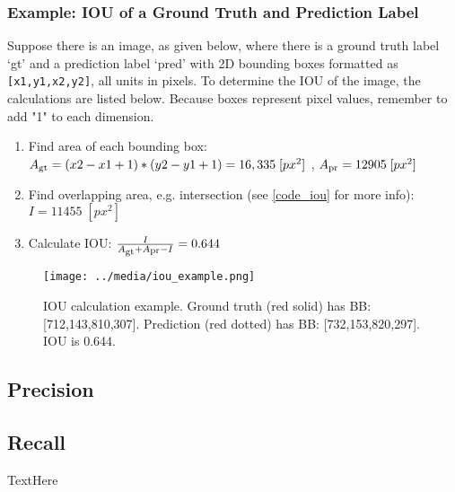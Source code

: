 \subsubsection{Example: IOU of a Ground Truth and Prediction Label}
Suppose there is an image, as given below, where there is a ground truth label `gt' and a prediction label `pred' with 2D bounding boxes formatted as \texttt{[x1,y1,x2,y2]}, all units in pixels. To determine the IOU of the image, the calculations are listed below. Because boxes represent pixel values, remember to add "1" to each dimension.



\def \pxpx {\; [px^2]}
\def \Asub #1{A\textsubscript{#1}}
\begin{enumerate}\itemsep=-0.5em

\item Find area of each bounding box: \\ $\Asub{gt} = (x2-x1+1)*(y2-y1+1) = 16,335 \pxpx $ , $ \Asub{pr} = 12905 \pxpx $

\item Find overlapping area, e.g. intersection (see \ref{code_iou} for more info): $I = 11455 \pxpx $

\item Calculate IOU: $\frac{I}{\Asub{gt} + \Asub{pr} - I} = 0.644 $
\end{enumerate}

\begin{figure}[h] %
    \centering
    \texttt{[image: ../media/iou\_example.png]}
    \caption{IOU calculation example. Ground truth (red solid) has BB: [712,143,810,307]. Prediction (red dotted) has BB: [732,153,820,297]. IOU is 0.644.}
    \label{iou_example} %
\end{figure}


\subsection{Precision}


\subsection{Recall}
TextHere










